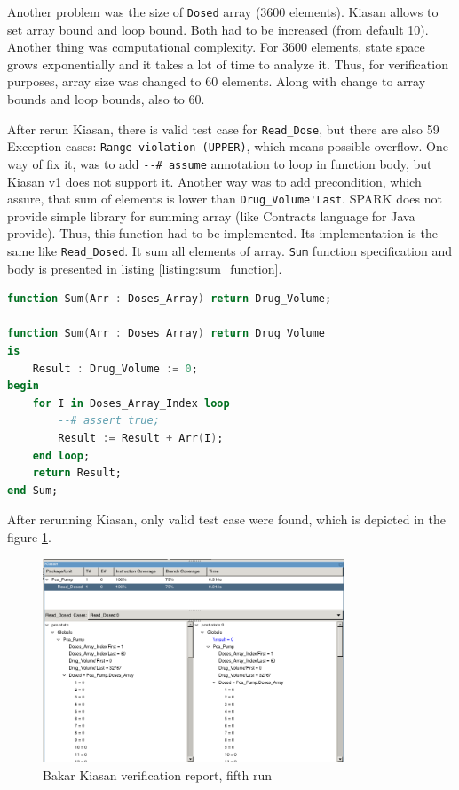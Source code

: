Another problem was the size of \lstinline{Dosed} array (3600 elements). Kiasan allows to set array bound and loop bound. Both had to be increased (from default 10). Another thing was computational complexity. For 3600 elements, state space grows exponentially and it takes a lot of time to analyze it. Thus, for verification purposes, array size was changed to 60 elements. Along with change to array bounds and loop bounds, also to 60.

After rerun Kiasan, there is valid test case for \lstinline{Read_Dose}, but there are also 59 Exception cases: \lstinline{Range violation (UPPER)}, which means possible overflow. One way of fix it, was to add \lstinline{--# assume} annotation to loop in function body, but Kiasan v1 does not support it. Another way was to add precondition, which assure, that sum of elements is lower than \lstinline{Drug_Volume'Last}. SPARK does not provide simple library for summing array (like Contracts language for Java provide). Thus, this function had to be implemented. Its implementation is the same like \lstinline{Read_Dosed}. It sum all elements of array. \lstinline{Sum} function specification and body is presented in listing \ref{listing:sum_function}.

\singlespacing
\begin{lstlisting}[language=ada, frame=single, gobble=0, caption={Sum function for summing all elements of array}, label={listing:sum_function}]
function Sum(Arr : Doses_Array) return Drug_Volume;

function Sum(Arr : Doses_Array) return Drug_Volume
is
    Result : Drug_Volume := 0;
begin
    for I in Doses_Array_Index loop
        --# assert true;
        Result := Result + Arr(I);
    end loop;
    return Result;
end Sum;
\end{lstlisting}
\doublespacing

After rerunning Kiasan, only valid test case were found, which is depicted in the figure \ref{figure:sparkverification:kiasanreport5}.

\begin{figure}[ht]%
    \begin{center}
        \includegraphics[width=0.8\textwidth]{figures/pca-pump-verification-step5.png}        
    \end{center}
    \caption{Bakar Kiasan verification report, fifth run}
    \label{figure:sparkverification:kiasanreport5}
\end{figure}


